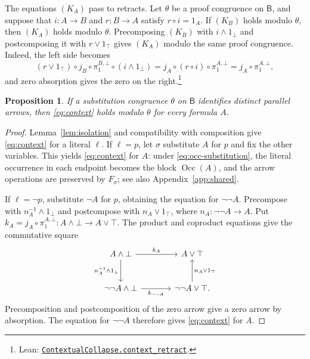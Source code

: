 \documentclass[11pt]{article}
\newtheorem{proposition}[theorem]{Proposition}
\newcommand{\B}{\mathsf B}
\newcommand{\Occ}{\operatorname{Occ}}
\begin{document}
The equations $(K_A)$ pass to retracts. Let $\theta$ be a proof
congruence on $\B$, and suppose that $i:A\to B$ and $r:B\to A$
satisfy $r\circ i=1_A$. If $(K_B)$ holds modulo $\theta$, then
$(K_A)$ holds modulo $\theta$.
Precomposing $(K_B)$ with $i\wedge1_\bot$ and postcomposing it
with $r\vee1_\top$ gives $(K_A)$ modulo the same proof
congruence. Indeed, the left side becomes
\[
 (r\vee1_\top)\circ j_B\circ\pi_1^{B,\bot}\circ(i\wedge1_\bot)
 =j_A\circ(r\circ i)\circ\pi_1^{A,\bot}
 =j_A\circ\pi_1^{A,\bot},
\]
and zero absorption gives the zero on the right.\footnote{\raggedright Lean:
\href{https://github.com/flengyel/Dosen-Petric-Maximality/blob/5dbee39bea09539bd130f729e82636419f71f920/DosenPetric/Substitution.lean\#L74}{\texttt{ContextualCollapse.\allowbreak{}context\_retract}}.}

\begin{proposition}\label{prop:all-contexts}
If a substitution congruence $\theta$ on $\B$ identifies distinct
parallel arrows, then \eqref{eq:context} holds modulo $\theta$ for
every formula $A$.
\end{proposition}

\begin{proof}
Lemma~\ref{lem:isolation} and compatibility with composition give
\eqref{eq:context} for a literal $\ell$.
If $\ell=p$, let $\sigma$ substitute $A$ for $p$ and fix the other variables.
This yields \eqref{eq:context} for $A$: under
\eqref{eq:occ-substitution}, the literal occurrence in each endpoint
becomes the block $\Occ(A)$, and the arrow operations are preserved
by $F_\sigma$; see also Appendix~\ref{app:shared}.

If $\ell=\neg p$, substitute $\neg A$ for $p$, obtaining the equation
for $\neg\neg A$. Precompose with
$n_A^{-1}\wedge1_\bot$ and postcompose with $n_A\vee1_\top$,
where $n_A:\neg\neg A\to A$.
Put
$k_A=j_A\circ\pi_1^{A,\bot}:A\wedge\bot\to A\vee\top$.
The product and coproduct equations give the commutative square
\[
\begin{tikzcd}[column sep=large,row sep=large]
 A\wedge\bot\arrow[r,"k_A"]\arrow[d,"n_A^{-1}\wedge1_\bot"']
   &A\vee\top\\
 \neg\neg A\wedge\bot\arrow[r,"k_{\neg\neg A}"']
   &\neg\neg A\vee\top\arrow[u,"n_A\vee1_\top"'].
\end{tikzcd}
\]
Precomposition and postcomposition of the zero arrow give a zero
arrow by absorption. The equation for $\neg\neg A$ therefore gives
\eqref{eq:context} for $A$.
\end{proof}
\end{document}
